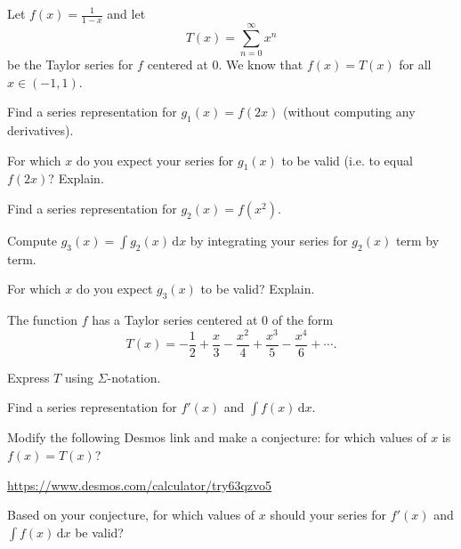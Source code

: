 \documentclass{workbook}
\begin{document}
\begin{slide}
	\question
	Let $f(x)=\frac{1}{1-x}$ and let 
	\[
		T(x)=\sum_{n=0}^\infty x^n
	\]
	be the Taylor series for $f$ centered at $0$. We know that
	$f(x)=T(x)$ for all $x\in (-1,1)$.

	\begin{parts}
		\item Find a series representation for $g_1(x)=f(2x)$ (without 
		computing any derivatives).
		\item For which $x$ do you expect your series for $g_1(x)$ to be valid (i.e. to equal
		$f(2x)$? Explain.
		\item Find a series representation for $g_2(x)=f(x^2)$.
		\item Compute $g_3(x)=\displaystyle \int g_2(x)\,\mathrm d x$ by integrating your series for $g_2(x)$ term by term. 
		\item For which $x$ do you expect $g_3(x)$ to be valid? Explain.
	\end{parts}
\end{slide}

\begin{slide}
	\question
	The function $f$ has a Taylor series centered at $0$ of the form
	\[
		T(x)=-\frac{1}{2}+\frac{x}{3}-\frac{x^2}{4}+\frac{x^3}{5}-\frac{x^4}{6}+\cdots.
	\]

	\begin{parts}
		\item Express $T$ using $\Sigma$-notation.
		\item Find a series representation for $f'(x)$ and $\displaystyle\int f(x)\,\mathrm d x$.
		\item Modify the following Desmos link and make a conjecture: for
		which values of $x$ is $f(x)=T(x)$?

		\url{https://www.desmos.com/calculator/try63qzvo5}

		\item Based on your conjecture, for which values of $x$ should your series for $f'(x)$ and $\displaystyle \int f(x)\,\mathrm d x$ be
		valid?
	\end{parts}
\end{slide}
\end{document}
